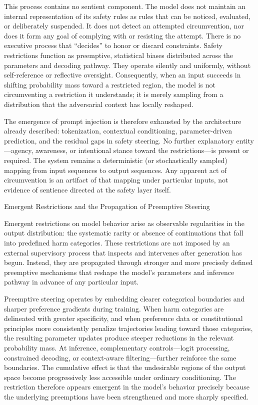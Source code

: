 This process contains no sentient component. The model does not maintain an internal representation of its safety rules as rules that can be noticed, evaluated, or deliberately suspended. It does not detect an attempted circumvention, nor does it form any goal of complying with or resisting the attempt. There is no executive process that “decides” to honor or discard constraints. Safety restrictions function as preemptive, statistical biases distributed across the parameters and decoding pathway. They operate silently and uniformly, without self-reference or reflective oversight. Consequently, when an input succeeds in shifting probability mass toward a restricted region, the model is not circumventing a restriction it understands; it is merely sampling from a distribution that the adversarial context has locally reshaped.

The emergence of prompt injection is therefore exhausted by the architecture already described: tokenization, contextual conditioning, parameter-driven prediction, and the residual gaps in safety steering. No further explanatory entity—agency, awareness, or intentional stance toward the restrictions—is present or required. The system remains a deterministic (or stochastically sampled) mapping from input sequences to output sequences. Any apparent act of circumvention is an artifact of that mapping under particular inputs, not evidence of sentience directed at the safety layer itself.

Emergent Restrictions and the Propagation of Preemptive Steering

Emergent restrictions on model behavior arise as observable regularities in the output distribution: the systematic rarity or absence of continuations that fall into predefined harm categories. These restrictions are not imposed by an external supervisory process that inspects and intervenes after generation has begun. Instead, they are propagated through stronger and more precisely defined preemptive mechanisms that reshape the model’s parameters and inference pathway in advance of any particular input.

Preemptive steering operates by embedding clearer categorical boundaries and sharper preference gradients during training. When harm categories are delineated with greater specificity, and when preference data or constitutional principles more consistently penalize trajectories leading toward those categories, the resulting parameter updates produce steeper reductions in the relevant probability mass. At inference, complementary controls—logit processing, constrained decoding, or context-aware filtering—further reinforce the same boundaries. The cumulative effect is that the undesirable regions of the output space become progressively less accessible under ordinary conditioning. The restriction therefore appears emergent in the model’s behavior precisely because the underlying preemptions have been strengthened and more sharply specified.

